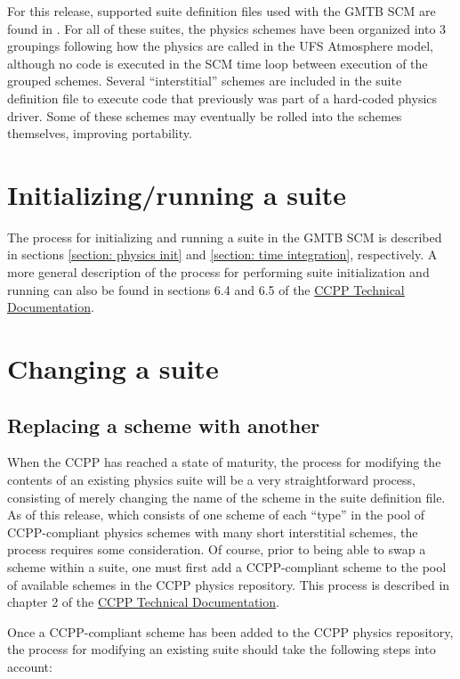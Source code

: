 For this release, supported suite definition files used with the GMTB SCM are found in . For all of these suites, the physics schemes have been organized into 3 groupings following how the physics are called in the UFS Atmosphere model, although no code is executed in the SCM time loop between execution of the grouped schemes. Several ``interstitial'' schemes are included in the suite definition file to execute code that previously was part of a hard-coded physics driver. Some of these schemes may eventually be rolled into the schemes themselves, improving portability.

\section{Initializing/running a suite}
The process for initializing and running a suite in the GMTB SCM is described in sections \ref{section: physics init} and \ref{section: time integration}, respectively. A more general description of the process for performing suite initialization and running can also be found in sections 6.4 and 6.5 of the \href{https://dtcenter.org/GMTB/v3.0/ccpp\_tech\_guide}{CCPP Technical Documentation}.

\section{Changing a suite}

\subsection{Replacing a scheme with another}

When the CCPP has reached a state of maturity, the process for modifying the contents of an existing physics suite will be a very straightforward process, consisting of merely changing the name of the scheme in the suite definition file. As of this release, which consists of one scheme of each ``type'' in the pool of CCPP-compliant physics schemes with many short interstitial schemes, the process requires some consideration. Of course, prior to being able to swap a scheme within a suite, one must first add a CCPP-compliant scheme to the pool of available schemes in the CCPP physics repository. This process is described in chapter 2 of the \href{https://dtcenter.org/GMTB/v3.0/ccpp\_tech\_guide}{CCPP Technical Documentation}.

Once a CCPP-compliant scheme has been added to the CCPP physics repository, the process for modifying an existing suite should take the following steps into account:

